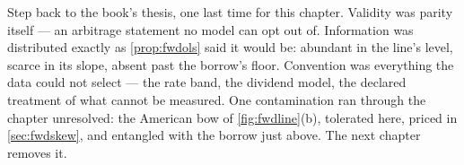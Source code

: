 Step back to the book's thesis, one last time for this chapter.
Validity was parity itself --- an arbitrage statement no model can
opt out of.  Information was distributed exactly as
\cref{prop:fwdols} said it would be: abundant in the line's level,
scarce in its slope, absent past the borrow's floor.  Convention was
everything the data could not select --- the rate band, the dividend
model, the declared treatment of what cannot be measured.  One
contamination ran through the chapter unresolved: the American bow of
\cref{fig:fwdline}(b), tolerated here, priced in
\cref{sec:fwdskew}, and entangled with the borrow just above.  The
next chapter removes it.
